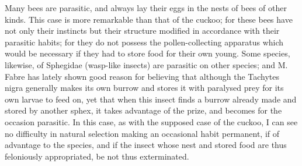 Many bees are parasitic, and always lay their eggs in the nests of bees of other kinds. This case is more remarkable than that of the cuckoo; for these bees have not only their instincts but their structure modified in accordance with their parasitic habits; for they do not possess the pollen-collecting apparatus which would be necessary if they had to store food for their own young. Some species, likewise, of Sphegidae (wasp-like insects) are parasitic on other species; and M. Fabre has lately shown good reason for believing that although the Tachytes nigra generally makes its own burrow and stores it with paralysed prey for its own larvae to feed on, yet that when this insect finds a burrow already made and stored by another sphex, it takes advantage of the prize, and becomes for the occasion parasitic. In this case, as with the supposed case of the cuckoo, I can see no difficulty in natural selection making an occasional habit permanent, if of advantage to the species, and if the insect whose nest and stored food are thus feloniously appropriated, be not thus exterminated.

